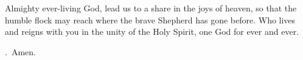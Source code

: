 \lettrine[lines=3]{A}{}lmighty ever-living God,
lead us to a share in the joys of heaven,
so that the humble flock may reach
where the brave Shepherd has gone before.
Who lives and reigns with you in the unity of the Holy Spirit,
one God for ever and ever.
\par \Rbar.~Amen.
